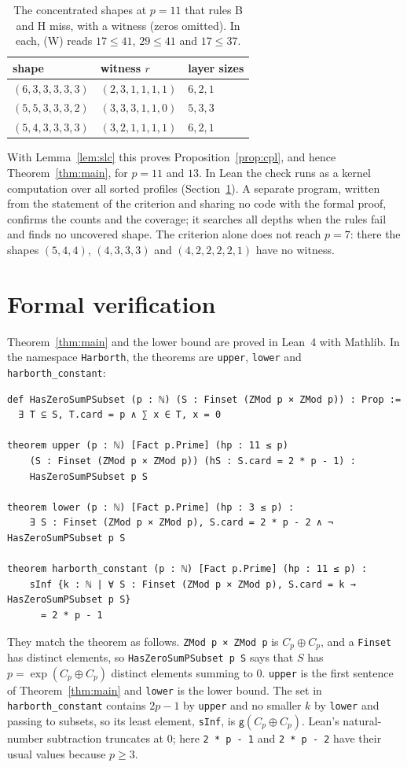 \documentclass[11pt]{article}
\theoremstyle{remark}
\begin{document}
\begin{table}[ht]
\centering
\begin{tabular}{lll}
shape & witness $r$ & layer sizes\\\hline
$(6,3,3,3,3,3)$ & $(2,3,1,1,1,1)$ & $6,2,1$\\
$(5,5,3,3,3,2)$ & $(3,3,3,1,1,0)$ & $5,3,3$\\
$(5,4,3,3,3,3)$ & $(3,2,1,1,1,1)$ & $6,2,1$
\end{tabular}
\caption{The concentrated shapes at $p=11$ that rules B and H miss, with a witness (zeros omitted). In each, (W) reads $17\le41$, $29\le41$ and $17\le37$.}\label{tab:p11}
\end{table}

With Lemma~\ref{lem:slc} this proves Proposition~\ref{prop:cpl}, and hence Theorem~\ref{thm:main}, for $p=11$ and $13$. In Lean the check runs as a kernel computation over all sorted profiles (Section~\ref{sec:lean}). A separate program, written from the statement of the criterion and sharing no code with the formal proof, confirms the counts and the coverage; it searches all depths when the rules fail and finds no uncovered shape. The criterion alone does not reach $p=7$: there the shapes $(5,4,4)$, $(4,3,3,3)$ and $(4,2,2,2,2,1)$ have no witness.

\section{Formal verification}\label{sec:lean}

Theorem~\ref{thm:main} and the lower bound are proved in Lean~4 with Mathlib. In the namespace \texttt{Harborth}, the theorems are \texttt{upper}, \texttt{lower} and \texttt{harborth\_constant}:
{\small
\begin{verbatim}
def HasZeroSumPSubset (p : ℕ) (S : Finset (ZMod p × ZMod p)) : Prop :=
  ∃ T ⊆ S, T.card = p ∧ ∑ x ∈ T, x = 0

theorem upper (p : ℕ) [Fact p.Prime] (hp : 11 ≤ p)
    (S : Finset (ZMod p × ZMod p)) (hS : S.card = 2 * p - 1) :
    HasZeroSumPSubset p S

theorem lower (p : ℕ) [Fact p.Prime] (hp : 3 ≤ p) :
    ∃ S : Finset (ZMod p × ZMod p), S.card = 2 * p - 2 ∧ ¬ HasZeroSumPSubset p S

theorem harborth_constant (p : ℕ) [Fact p.Prime] (hp : 11 ≤ p) :
    sInf {k : ℕ | ∀ S : Finset (ZMod p × ZMod p), S.card = k → HasZeroSumPSubset p S}
      = 2 * p - 1
\end{verbatim}
}
They match the theorem as follows. \texttt{ZMod p × ZMod p} is $C_p\oplus C_p$, and a \texttt{Finset} has distinct elements, so \texttt{HasZeroSumPSubset p S} says that $S$ has $p=\exp(C_p\oplus C_p)$ distinct elements summing to $0$. \texttt{upper} is the first sentence of Theorem~\ref{thm:main} and \texttt{lower} is the lower bound. The set in \texttt{harborth\_constant} contains $2p-1$ by \texttt{upper} and no smaller $k$ by \texttt{lower} and passing to subsets, so its least element, \texttt{sInf}, is $\mathsf g(C_p\oplus C_p)$. Lean's natural-number subtraction truncates at $0$; here \mbox{\texttt{2 * p - 1}} and \mbox{\texttt{2 * p - 2}} have their usual values because $p\ge3$.
\end{document}
